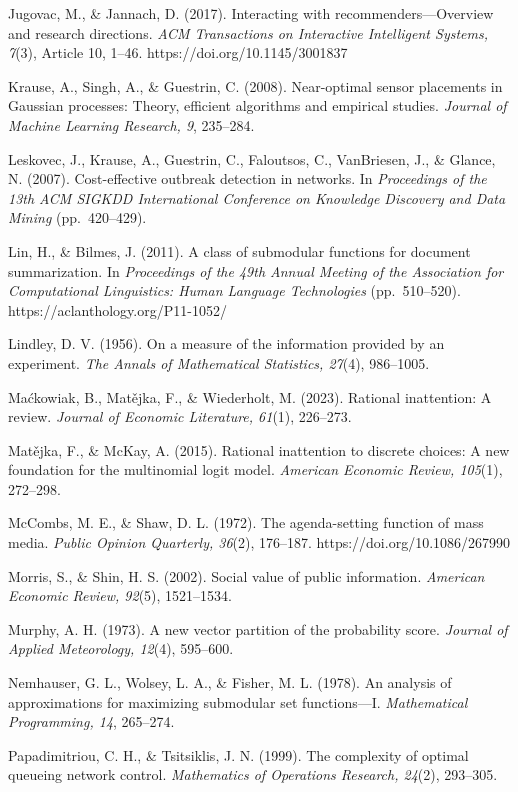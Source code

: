 \documentclass[
  11pt]{article}
\begin{document}
Jugovac, M., \& Jannach, D. (2017). Interacting with
recommenders---Overview and research directions. \emph{ACM Transactions
on Interactive Intelligent Systems, 7}(3), Article 10, 1--46.
https://doi.org/10.1145/3001837

Krause, A., Singh, A., \& Guestrin, C. (2008). Near-optimal sensor
placements in Gaussian processes: Theory, efficient algorithms and
empirical studies. \emph{Journal of Machine Learning Research, 9},
235--284.

Leskovec, J., Krause, A., Guestrin, C., Faloutsos, C., VanBriesen, J.,
\& Glance, N. (2007). Cost-effective outbreak detection in networks. In
\emph{Proceedings of the 13th ACM SIGKDD International Conference on
Knowledge Discovery and Data Mining} (pp.~420--429).

Lin, H., \& Bilmes, J. (2011). A class of submodular functions for
document summarization. In \emph{Proceedings of the 49th Annual Meeting
of the Association for Computational Linguistics: Human Language
Technologies} (pp.~510--520). https://aclanthology.org/P11-1052/

Lindley, D. V. (1956). On a measure of the information provided by an
experiment. \emph{The Annals of Mathematical Statistics, 27}(4),
986--1005.

Maćkowiak, B., Matějka, F., \& Wiederholt, M. (2023). Rational
inattention: A review. \emph{Journal of Economic Literature, 61}(1),
226--273.

Matějka, F., \& McKay, A. (2015). Rational inattention to discrete
choices: A new foundation for the multinomial logit model.
\emph{American Economic Review, 105}(1), 272--298.

McCombs, M. E., \& Shaw, D. L. (1972). The agenda-setting function of
mass media. \emph{Public Opinion Quarterly, 36}(2), 176--187.
https://doi.org/10.1086/267990

Morris, S., \& Shin, H. S. (2002). Social value of public information.
\emph{American Economic Review, 92}(5), 1521--1534.

Murphy, A. H. (1973). A new vector partition of the probability score.
\emph{Journal of Applied Meteorology, 12}(4), 595--600.

Nemhauser, G. L., Wolsey, L. A., \& Fisher, M. L. (1978). An analysis of
approximations for maximizing submodular set functions---I.
\emph{Mathematical Programming, 14}, 265--274.

Papadimitriou, C. H., \& Tsitsiklis, J. N. (1999). The complexity of
optimal queueing network control. \emph{Mathematics of Operations
Research, 24}(2), 293--305.
\end{document}
